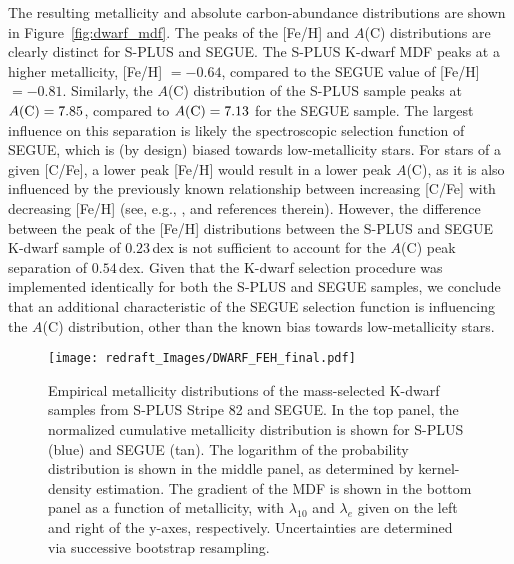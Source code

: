 \documentclass[twocolumn,trackchanges]{aastex63}
\begin{document}
The resulting metallicity and absolute carbon-abundance distributions are shown in Figure~\ref{fig:dwarf_mdf}. The peaks of the [Fe/H] and $A$(C) distributions are clearly distinct for S-PLUS and SEGUE. The S-PLUS K-dwarf MDF peaks at a higher metallicity, [Fe/H] $=-0.64$, compared to the SEGUE value of [Fe/H] $=-0.81$. Similarly, the $A$(C) distribution of the S-PLUS sample peaks at $A({\rm C})=7.85$, compared to $A({\rm C})=7.13$ for the SEGUE sample. The largest influence on this separation is likely the spectroscopic selection function of SEGUE, which is (by design) biased towards low-metallicity stars. For stars of a given [C/Fe], a lower peak [Fe/H] would result in a lower peak $A$(C), as it is also influenced by the previously known relationship between increasing [C/Fe] with decreasing [Fe/H] (see, e.g., \citealt{Yoon:2018:AEGIS}, and references therein).  However, the difference between the peak of the [Fe/H] distributions between the S-PLUS and SEGUE K-dwarf sample of $0.23$\,dex is not sufficient to account for the $A$(C) peak separation of $0.54$\,dex. Given that the K-dwarf selection procedure was implemented identically for both the S-PLUS and SEGUE samples, we conclude that an additional characteristic of the SEGUE selection function is influencing the $A$(C) distribution, other than the known bias towards low-metallicity stars.


\begin{figure}
	\centering
	\texttt{[image: redraft\_Images/DWARF\_FEH\_final.pdf]}
	
	\caption{Empirical metallicity distributions of the mass-selected K-dwarf samples from S-PLUS Stripe 82 and SEGUE. In the top panel, the normalized cumulative metallicity distribution is shown for S-PLUS (blue) and SEGUE (tan). The logarithm of the probability distribution is shown in the middle panel, as determined by kernel-density estimation. The gradient of the MDF is shown in the bottom panel as a function of metallicity, with $\lambda_{10}$ and $\lambda_e$ given on the left and right of the y-axes, respectively. Uncertainties are determined via successive bootstrap resampling.
		\label{fig:dwarf_mdf_lambda}}
\end{figure}
\end{document}
